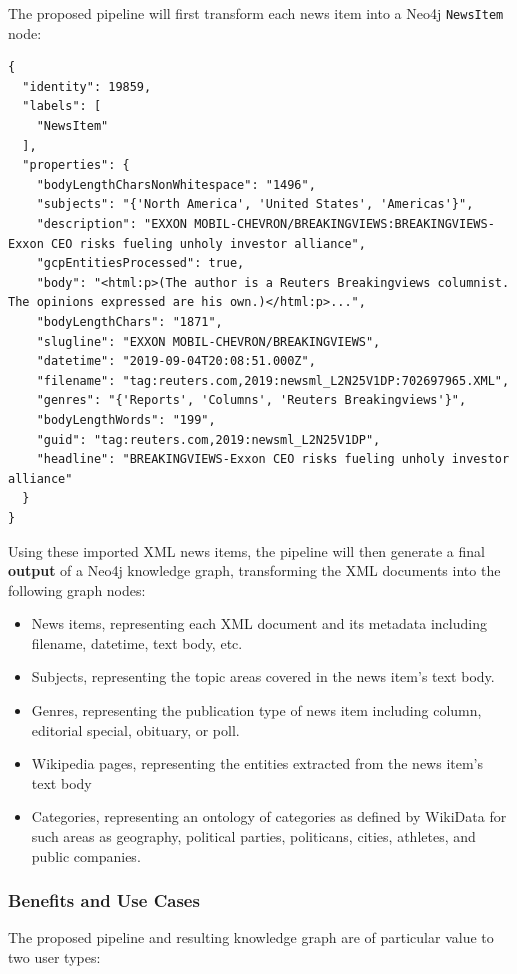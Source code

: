 \documentclass[11pt]{article}
\begin{document}
The proposed pipeline will first transform each news item into a Neo4j \lstinline{NewsItem} node:

\begin{lstlisting}[basicstyle=\tiny]
{
  "identity": 19859,
  "labels": [
    "NewsItem"
  ],
  "properties": {
    "bodyLengthCharsNonWhitespace": "1496",
    "subjects": "{'North America', 'United States', 'Americas'}",
    "description": "EXXON MOBIL-CHEVRON/BREAKINGVIEWS:BREAKINGVIEWS-Exxon CEO risks fueling unholy investor alliance",
    "gcpEntitiesProcessed": true,
    "body": "<html:p>(The author is a Reuters Breakingviews columnist.  The opinions expressed are his own.)</html:p>...",
    "bodyLengthChars": "1871",
    "slugline": "EXXON MOBIL-CHEVRON/BREAKINGVIEWS",
    "datetime": "2019-09-04T20:08:51.000Z",
    "filename": "tag:reuters.com,2019:newsml_L2N25V1DP:702697965.XML",
    "genres": "{'Reports', 'Columns', 'Reuters Breakingviews'}",
    "bodyLengthWords": "199",
    "guid": "tag:reuters.com,2019:newsml_L2N25V1DP",
    "headline": "BREAKINGVIEWS-Exxon CEO risks fueling unholy investor alliance"
  }
}
\end{lstlisting}

Using these imported XML news items, the pipeline will then generate a final \textbf{output} of a Neo4j knowledge graph, transforming the XML documents into the following graph nodes:
\begin{itemize}
  \item{News items, representing each XML document and its metadata including filename, datetime, text body, etc.}
  \item{Subjects, representing the topic areas covered in the news item's text body.}
  \item{Genres, representing the publication type of news item including column, editorial special, obituary, or poll.}
  \item{Wikipedia pages, representing the entities extracted from the news item's text body}
  \item{Categories, representing an ontology of categories as defined by WikiData for such areas as geography, political parties, politicans, cities, athletes, and public companies.}
\end{itemize}

\subsubsection{Benefits and Use Cases}
The proposed pipeline and resulting knowledge graph are of particular value to two user types:
\end{document}
